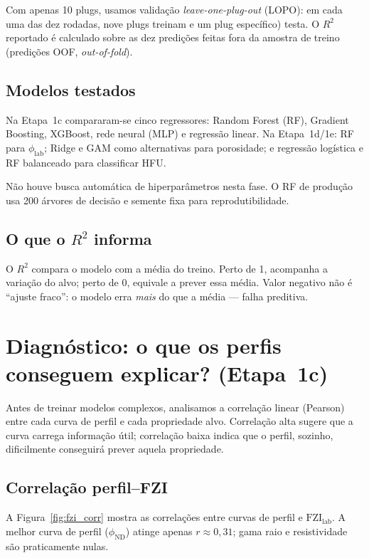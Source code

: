 \documentclass[11pt,a4paper]{article}
\newcommand{\philab}{\ensuremath{\phi_{\mathrm{lab}}}}
\newcommand{\fzilab}{\ensuremath{\mathrm{FZI}_{\mathrm{lab}}}}
\newcommand{\phiND}{\ensuremath{\phi_{\mathrm{ND}}}}
\begin{document}
Com apenas 10 plugs, usamos validação \emph{leave-one-plug-out}
(LOPO): em cada uma das dez rodadas, nove plugs treinam e um plug
específico) testa.
O $R^2$ reportado é calculado sobre as dez predições feitas fora
da amostra de treino (predições OOF, \emph{out-of-fold}).

\subsection{Modelos testados}

Na Etapa~1c compararam-se cinco regressores: Random Forest (RF), Gradient
Boosting, XGBoost, rede neural (MLP) e regressão linear.
Na Etapa~1d/1e: RF para \philab{}; Ridge e GAM como alternativas
para porosidade; e regressão logística e RF balanceado para
classificar HFU.

Não houve busca automática de hiperparâmetros nesta fase.
O RF de produção usa 200 árvores de decisão e semente fixa para
reprodutibilidade.

\subsection{O que o $R^2$ informa}

O $R^2$ compara o modelo com a média do treino.
Perto de 1, acompanha a variação do alvo; perto de 0, equivale a
prever essa média. Valor negativo não é ``ajuste fraco'': o modelo
erra \emph{mais} do que a média --- falha preditiva.

\section{Diagnóstico: o que os perfis conseguem explicar? (Etapa~1c)}
\label{sec:diagnostico}

Antes de treinar modelos complexos, analisamos a correlação linear
(Pearson) entre cada curva de perfil e cada propriedade alvo.
Correlação alta sugere que a curva carrega informação útil;
correlação baixa indica que o perfil, sozinho, dificilmente
conseguirá prever aquela propriedade.

\subsection{Correlação perfil--FZI}

A Figura~\ref{fig:fzi_corr} mostra as correlações entre curvas de
perfil e \fzilab{}.
A melhor curva de perfil (\phiND{}) atinge apenas $r \approx 0{,}31$;
gama raio e resistividade são praticamente nulas.
\end{document}
